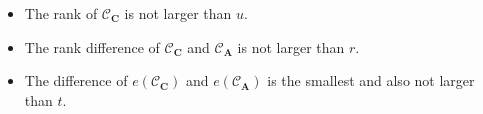 \documentclass[bachelor]{thesis-uestc}
\begin{document}
\begin{itemize}[leftmargin=*]
    \item  The rank of $\mathcal{C}_\mathbf{C}$ is not larger than $u$.
    \item  The rank difference of $\mathcal{C}_\mathbf{C}$ and $\mathcal{C}_\mathbf{A}$ is not larger than $r$.  
    \item  The difference of $e(\mathcal{C}_\mathbf{C})$ and $e(\mathcal{C}_\mathbf{A})$ is the smallest and also not larger than $t$.
\end{itemize}

\end{document}
